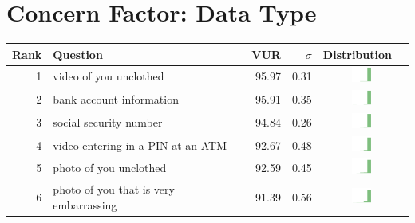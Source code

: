 
\section{Concern Factor: Data Type}
\label{sec:data-appendix} 

\begin{table}[t]
\begin{center}
\small
\begin{tabular}{| r | l | r | r | r | r |}
\hline
Rank & Question & VUR & $\sigma$ & Distribution \\
\hline
1 & video of you unclothed & 95.97 & 0.31 &  \includegraphics[width = 2cm, height = 0.5cm]{tex-inputs/table-images/tookavideoofyouunclothedcombined} \\ 
2 & bank account information & 95.91 & 0.35 & \includegraphics[width = 2cm, height = 0.5cm]{tex-inputs/table-images/learnedyourbankaccountinformationcombined} \\ 
3 & social security number & 94.84 & 0.26 & \includegraphics[width = 2cm, height = 0.5cm]{tex-inputs/table-images/learnedyoursocialsecuritynumbercombined} \\ 
4 & video entering in a PIN at an ATM & 92.67 & 0.48 &  \includegraphics[width = 2cm, height = 0.5cm]{tex-inputs/table-images/tookavideoofyouenteringinyourPINatanATMcombined} \\ 
5 & photo of you unclothed & 92.59 & 0.45 &  \includegraphics[width = 2cm, height = 0.5cm]{tex-inputs/table-images/tookaphotoofyouunclothedcombined} \\ 
6 & photo of you that is very embarrassing & 91.39 & 0.56 &  \includegraphics[width = 2cm, height = 0.5cm]{tex-inputs/table-images/tookanincriminatingphotoofyoudoingsomethingembarrassingcombined} \\ 

\end{tabular}
\end{center}
\end{table}
